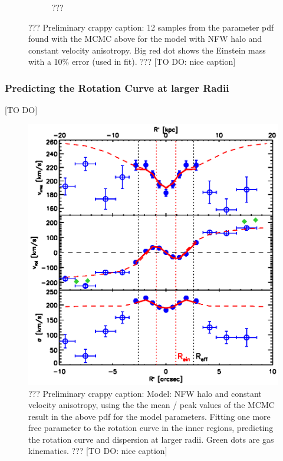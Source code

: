 \begin{figure}
\begin{subfigure}{.5\textwidth}
  \caption{???}
  \label{fig:???}
\end{subfigure}
\caption{??? Preliminary crappy caption: 12 samples from the parameter pdf found with the MCMC above for the model with NFW halo and constant velocity anisotropy. Big red dot shows the Einstein mass with a 10\% error (used in fit). ??? [TO DO: nice caption]}
\label{fig:???}
\end{figure}



\subsubsection{Predicting the Rotation Curve at larger Radii}

[TO DO]

\begin{figure}
\centering
\includegraphics[width=0.7\linewidth]{fig/B4_rms_rot_curves_best_model.ps}
\caption{??? Preliminary crappy caption: Model: NFW halo and constant velocity anisotropy, using the the mean / peak values of the MCMC result in the above pdf for the model parameters. Fitting one more free parameter to the rotation curve in the inner regions, predicting the rotation curve and dispersion at larger radii. Green dots are gas kinematics. ??? [TO DO: nice caption]}
\label{fig:???}
\end{figure}
